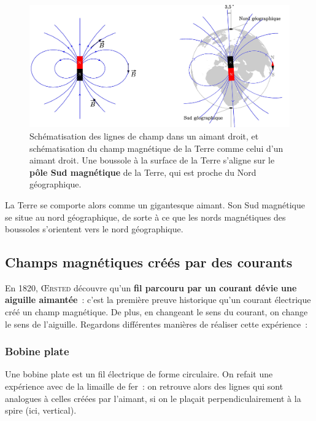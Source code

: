\documentclass[../../main/main.tex]{subfiles}
\begin{document}
\begin{figure}[h]
	\centering
	\includegraphics[scale=1]{aimdroit.jpg}
	\caption{Schématisation des lignes de champ dans un aimant droit, et
		schématisation du champ magnétique de la Terre comme celui d'un aimant droit.
		Une boussole à la surface de la Terre s'aligne sur le \textbf{pôle Sud magnétique}
		de la Terre, qui est proche du Nord géographique.}
	\label{fig:aimdroitterre}
\end{figure}

La Terre se comporte alors comme un gigantesque aimant. Son Sud magnétique se
situe au nord géographique, de sorte à ce que les nords magnétiques des
boussoles s'orientent vers le nord géographique.

\subsection{Champs magnétiques créés par des courants}
\label{ssec:chpcour}

En 1820, \textsc{Œrsted} découvre qu'un \textbf{fil parcouru par un courant
dévie une aiguille aimantée}~: c'est la première preuve historique qu'un courant
électrique créé un champ magnétique. De plus, en changeant le sens du courant,
on change le sens de l'aiguille. Regardons différentes manières de réaliser
cette expérience~:

\subsubsection{Bobine plate}
\label{sssec:bplate}
Une bobine plate est un fil électrique de forme circulaire. On refait une
expérience avec de la limaille de fer~: on retrouve alors des lignes qui sont
analogues à celles créées par l'aimant, si on le plaçait perpendiculairement à
la spire (ici, vertical).
\end{document}
